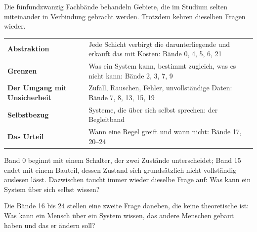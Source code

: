 Die fünfundzwanzig Fachbände behandeln Gebiete, die im Studium selten miteinander in Verbindung gebracht werden. Trotzdem kehren dieselben Fragen wieder.

\begin{merksatz}
\begin{center}
\renewcommand{\arraystretch}{1.5}
\begin{tabular}{@{}P{3.0cm}P{6.0cm}@{}}
\toprule
\textbf{Abstraktion} & Jede Schicht verbirgt die darunterliegende und erkauft das mit Kosten: Bände 0, 4, 5, 6, 21\\
\textbf{Grenzen} & Was ein System kann, bestimmt zugleich, was es nicht kann: Bände 2, 3, 7, 9\\
\textbf{Der Umgang mit Unsicherheit} & Zufall, Rauschen, Fehler, unvollständige Daten: Bände 7, 8, 13, 15, 19\\
\textbf{Selbstbezug} & Systeme, die über sich selbst sprechen: der Begleitband\\
\textbf{Das Urteil} & Wann eine Regel greift und wann nicht: Bände 17, 20--24\\
\bottomrule
\end{tabular}
\end{center}

\begin{center}
\begin{minipage}{0.88\textwidth}
\end{minipage}
\end{center}
\end{merksatz}

Band 0 beginnt mit einem Schalter, der zwei Zustände unterscheidet; Band 15 endet mit einem Bauteil, dessen Zustand sich grundsätzlich nicht vollständig auslesen lässt. Dazwischen taucht immer wieder dieselbe Frage auf: Was kann ein System über sich selbst wissen?

Die Bände 16 bis 24 stellen eine zweite Frage daneben, die keine theoretische ist: Was kann ein Mensch über ein System wissen, das andere Menschen gebaut haben und das er ändern soll?

